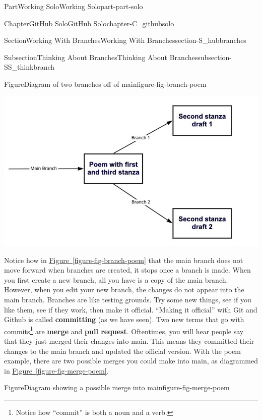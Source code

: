\documentclass[oneside,10pt,]{book}
\newcommand{\xreffont}{\relax}
\newcommand{\terminology}[1]{\textbf{#1}}
\begin{document}
\begin{partptx}{Part}{Working Solo}{}{Working Solo}{}{}{part-part-solo}
\begin{chapterptx}{Chapter}{GitHub Solo}{}{GitHub Solo}{}{}{chapter-C_githubsolo}
\begin{sectionptx}{Section}{Working With Branches}{}{Working With Branches}{}{}{section-S_hubbranches}
\begin{subsectionptx}{Subsection}{Thinking About Branches}{}{Thinking About Branches}{}{}{subsection-SS_thinkbranch}
\begin{figureptx}{Figure}{Diagram of two branches off of main}{figure-fig-branch-poem}{}%
\begin{image}{0}{1}{0}{}%
\includegraphics[width=\linewidth]{external/branch_poem.pdf}
\end{image}%
\tcblower
\end{figureptx}%
 Notice how in \hyperref[figure-fig-branch-poem]{Figure~{\xreffont\ref{figure-fig-branch-poem}}} that the main branch does not move forward when branches are created, it stops once a branch is made. When you first create a new branch, all you have is a copy of the main branch. However, when you edit your new branch, the changes do not appear into the main branch. Branches are like testing grounds. Try some new things, see if you like them, see if they work, then make it official. ``Making it official'' with Git and Github is called \terminology{committing} (as we have seen). Two new terms that go with commits\footnote{Notice how ``commit'' is both a noun and a verb.\label{fn-SS_thinkbranch-i-k}} are \terminology{merge} and \terminology{pull request}. Oftentimes, you will hear people say that they just merged their changes into main. This means they committed their changes to the main branch and updated the official version. With the poem example, there are two possible merges you could make into main, as diagrammed in \hyperref[figure-fig-merge-poem]{Figure~{\xreffont\ref{figure-fig-merge-poem}}}.%
\begin{figureptx}{Figure}{Diagram showing a possible merge into main}{figure-fig-merge-poem}{}%
\begin{image}{0.05}{0.9}{0.05}{}%

\end{image}
\end{figureptx}
\end{subsectionptx}
\end{sectionptx}
\end{chapterptx}
\end{partptx}
\end{document}
